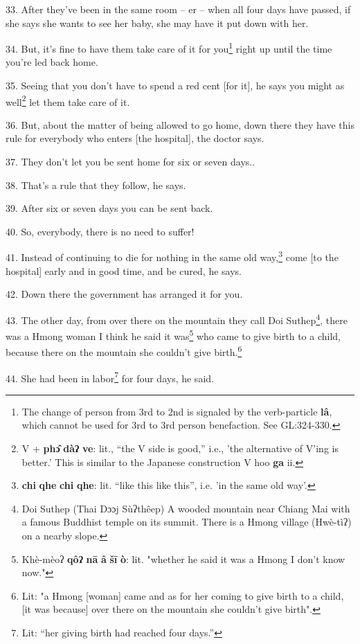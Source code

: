33. After they've been in the same room -- er -- when all four days have passed,
if she says she wants to see her baby, she may have it put down with her.

34. But, it's fine to have them take care of it for you\footnote{The change of person from 3rd to 2nd is signaled by the verb-particle \textbf{lâ}, which cannot be used for 3rd to 3rd person benefaction. See GL:324-330.} right up until the
time you're led back home.

35. Seeing that you don't have to spend a red cent [for it], he says you might
as well\footnote{V + \textbf{phɔ̂} \textbf{dàʔ} \textbf{ve}: lit., ``the V side is good,'' i.e., 'the alternative of V'ing is better.' This is similar to the Japanese construction V hoo \textbf{ga} ii.} let them take care of it.

36. But, about the matter of being allowed to go home, down there they have this
rule for everybody who enters [the hospital], the doctor says.

37. They don't let you be sent home for six or seven days..

38. That's a rule that they follow, he says.

39. After six or seven days you can be sent back.

40. So, everybody, there is no need to suffer!

41. Instead of continuing to die for nothing in the same old way,\footnote{\textbf{chi} \textbf{qhe} \textbf{chi} \textbf{qhe}: lit. ``like this like this'', i.e. 'in the same old way'.} come [to
the hospital] early and in good time, and be cured, he says.

42. Down there the government has arranged it for you.

43. The other day, from over there on the mountain they call Doi Suthep\footnote{Doi Suthep (Thai Dɔɔj Sùʔthêep) A wooded mountain near Chiang Mai with a famous Buddhist temple on its summit. There is a Hmong village (Hwè-tìʔ) on a nearby slope.}, there
was a Hmong woman I think he said it was\footnote{Khè-mèoʔ \textbf{qôʔ} \textbf{nā} \textbf{â} \textbf{šī} \textbf{ò}: lit. "whether he said it was a Hmong I don't know now."} who came to give birth to a child,
because there on the mountain she couldn't give birth.\footnote{Lit: "a Hmong [woman] came and as for her coming to give birth to a child, [it was because] over there on the mountain she couldn't give birth".}

44. She had been in labor\footnote{Lit: ``her giving birth had reached four days.''} for four days, he said.

